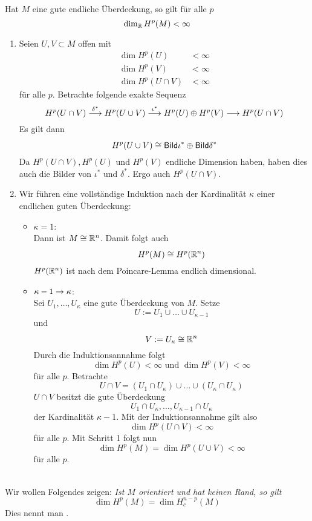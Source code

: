 \Satz{}
Hat $M$ eine gute endliche Überdeckung, so gilt für alle $p$
\[ \dim_{\mathbb{R}} H^p(M) < \infty \]
\begin{Beweis}{}
\begin{enumerate}
	\item Seien $U,V \subset M$ offen mit
	\begin{align*}
	\dim H^p(U) &< \infty\\
	\dim H^p(V) &< \infty\\
	\dim H^p(U\cap V) &< \infty
	\end{align*}
	für alle $p$. Betrachte folgende exakte Sequenz
	\[ 
	H^p(U\cap V)
	\overset{\delta^*}{\longrightarrow}
	H^p(U\cup V)
	\overset{\iota^*}{\longrightarrow}
	H^p(U) \oplus H^p(V)
	\overset{}{\longrightarrow}
	H^p(U\cap V)
	 \]
	 Es gilt dann
	 \[ H^p(U\cup V) \overset{}{\cong} \textsf{Bild} \iota^* \oplus \textsf{Bild} \delta^* \]
	 Da $H^p(U\cap V), H^p(U)$ und $H^p(V)$ endliche Dimension haben, haben dies auch die Bilder von $\iota^*$ und $\delta^*$. Ergo auch $H^p(U\cap V)$.
	 \item Wir führen eine vollständige Induktion nach der Kardinalität $\kappa$ einer endlichen guten Überdeckung:
	 \begin{itemize}
	 	\item $\kappa = 1$:\\
	 	Dann ist $M \overset{}{\cong} \mathbb{R}^n$. Damit folgt auch
	 	\[ H^p(M) \overset{}{\cong} H^p(\mathbb{R}^n) \]
	 	$H^p(\mathbb{R}^n)$ ist nach dem Poincare-Lemma endlich dimensional.
	 	\item $\kappa - 1 \overset{}{\rightarrow} \kappa$:\\
	 	Sei $U_1, \ldots, U_\kappa$ eine gute Überdeckung von $M$. Setze
	 	\[ U:= U_1 \cup \ldots \cup U_{\kappa-1} \]
	 	und
	 	\[ V:= U_\kappa \overset{}{\cong} \mathbb{R}^n \]
	 	Durch die Induktionsannahme folgt
	 	\[ \dim H^p(U)< \infty \text{  und  } \dim H^p(V)<\infty \]
	 	für alle $p$. Betrachte
	 	\[ U\cap V = (U_1\cap U_\kappa) \cup \ldots \cup (U_\kappa\cap U_\kappa) \]
	 	$U\cap V$ besitzt die gute Überdeckung
	 	\[ U_1\cap U_\kappa, \ldots, U_{\kappa - 1} \cap U_\kappa \]
	 	der Kardinalität $\kappa - 1$. Mit der Induktionsannahme gilt also
	 	\[ \dim H^p(U\cap V) < \infty \]
	 	für alle $p$. Mit Schritt 1 folgt nun
	 	\[ \dim H^p(M) = \dim H^p(U\cup V) < \infty \]
	 	für alle $p$.
	 \end{itemize}
\end{enumerate}
\end{Beweis}\\
Wir wollen Folgendes zeigen: \textit{Ist $M$ orientiert und hat keinen Rand, so gilt}
\[ \dim H^p(M) = \dim H_c^{n-p}(M) \]
Dies nennt man .\\

